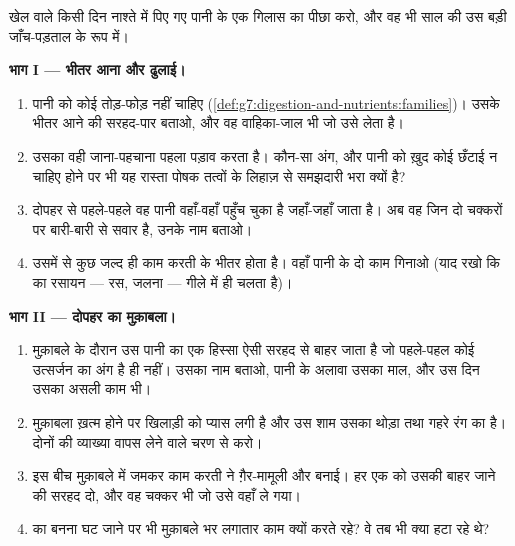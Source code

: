 \begin{problem}[{सप्ताहांत समस्या --- पानी का एक गिलास, पूरी मशीन भर
जाँचा हुआ}]\label{pb:g7:removing-wastes:1}
खेल वाले किसी दिन नाश्ते में पिए गए पानी के एक गिलास का पीछा करो, और
वह भी साल की उस बड़ी जाँच-पड़ताल के रूप में।

\medskip\noindent\textbf{भाग I --- भीतर आना और ढुलाई।}
\begin{enumerate}
  \item पानी को कोई तोड़-फोड़ नहीं चाहिए
        (\cref{def:g7:digestion-and-nutrients:families})। उसके भीतर
        आने की सरहद-पार बताओ, और वह वाहिका-जाल भी जो उसे लेता है।
  \item उसका  वही जाना-पहचाना पहला पड़ाव करता है। कौन-सा अंग, और
        पानी को ख़ुद कोई छँटाई न चाहिए होने पर भी यह रास्ता पोषक
        तत्वों के लिहाज़ से समझदारी भरा क्यों है?
  \item दोपहर से पहले-पहले वह पानी वहाँ-वहाँ पहुँच चुका है जहाँ-जहाँ
         जाता है। अब वह जिन दो चक्करों पर बारी-बारी से सवार है,
        उनके नाम बताओ।
  \item उसमें से कुछ जल्द ही काम करती  के भीतर होता है। वहाँ
        पानी के दो काम गिनाओ (याद रखो कि  का रसायन ---
        रस, जलना --- गीले में ही चलता है)।
\end{enumerate}

\medskip\noindent\textbf{भाग II --- दोपहर का मुक़ाबला।}
\begin{enumerate}[resume]
  \item मुक़ाबले के दौरान उस पानी का एक हिस्सा ऐसी सरहद से बाहर जाता
        है जो पहले-पहल कोई उत्सर्जन का अंग है ही नहीं। उसका नाम
        बताओ, पानी के अलावा उसका माल, और उस दिन उसका असली काम भी।
  \item मुक़ाबला ख़त्म होने पर खिलाड़ी को प्यास लगी है और उस शाम उसका
         थोड़ा तथा गहरे रंग का है। दोनों की व्याख्या वापस लेने
        वाले चरण से करो।
  \item इस बीच मुक़ाबले में जमकर काम करती  ने ग़ैर-मामूली
         और  बनाई। हर एक को उसकी बाहर जाने की
        सरहद दो, और वह चक्कर भी जो उसे वहाँ ले गया।
  \item {} का बनना घट जाने पर भी  मुक़ाबले भर लगातार काम
        क्यों करते रहे? वे तब भी क्या हटा रहे थे?
\end{enumerate}


\end{problem}
